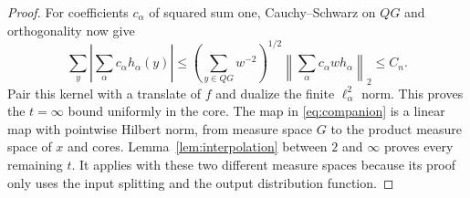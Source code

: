 \documentclass[11pt,oneside]{article}
\theoremstyle{definition}\newtheorem{definition}[theorem]{Definition}
\theoremstyle{remark}\newtheorem{remark}[theorem]{Remark}
\begin{document}
\begin{proof}
For coefficients $c_\alpha$ of squared sum one, Cauchy--Schwarz on $QG$ and
orthogonality now give
\[
 \sum_y\left|\sum_\alpha c_\alpha h_\alpha(y)\right|
 \leq\left(\sum_{y\in QG}w^{-2}\right)^{1/2}
      \left\|\sum_\alpha c_\alpha w h_\alpha\right\|_2
 \leq C_n.
\]
Pair this kernel with a translate of $f$ and dualize the finite
$\ell^2_\alpha$ norm. This proves the $t=\infty$ bound uniformly in the core.
The map in \eqref{eq:companion} is a linear map with pointwise Hilbert norm,
from measure space $G$ to the product measure space of $x$ and cores.
Lemma~\ref{lem:interpolation} between $2$ and $\infty$ proves every remaining
$t$. It applies with these two different measure spaces because its proof
only uses the input splitting and the output distribution function.
\end{proof}
\end{document}
